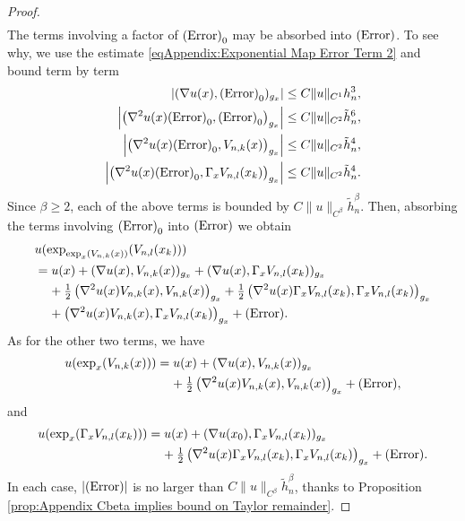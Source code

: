 \documentclass[11pt,reqno]{amsart}
\numberwithin{equation}{section}
\theoremstyle{plain}
\begin{document}
\begin{proof}
\begin{align*}
  \end{align*} 
  The terms involving a factor of $\textnormal{(Error)}_0$ may be absorbed into $\textnormal{(Error)}$. To see why, we use the estimate \eqref{eqAppendix:Exponential Map Error Term 2} and bound term by term
  \begin{align*}  
    |(\nabla u(x),\textnormal{(Error)}_0)_{g_x}| & \leq C\|u\|_{C^1}h_n^3,\\
    \left | \left (\nabla^2u(x)\textnormal{(Error)}_0,\textnormal{(Error)}_0\right )_{g_x}\right | & \leq C\|u\|_{C^2}\tilde h_n^{6},\\
    \left | \left (\nabla^2u(x)\textnormal{(Error)}_0,V_{n,k}(x)\right )_{g_x}\right | & \leq C\|u\|_{C^2}\tilde h_n^4,\\
    \left | \left (\nabla^2u(x)\textnormal{(Error)}_0,\Gamma_xV_{n,l}(x_k)\right )_{g_x}\right | & \leq C\|u\|_{C^2}\tilde h_n^4.	
  \end{align*}
  Since $\beta \geq 2$, each of the above terms is bounded by $C\|u\|_{C^\beta}\tilde h_n^\beta$. Then, absorbing the terms involving $\textnormal{(Error)}_0$ into $\textnormal{(Error)}$ we obtain 
 \begin{align*}
    & u(\exp_{\exp_x(V_{n,k}(x))}(V_{n,l}(x_k)))\\
    & = u(x)+ (\nabla u(x),V_{n,k}(x))_{g_x}+(\nabla u(x),\Gamma_xV_{n,l}(x_k))_{g_x}\\
    & \;\;\;\; + \tfrac{1}{2} \left (\nabla^2u(x) V_{n,k}(x),V_{n,k}(x)\right )_{g_x}+\tfrac{1}{2} \left (\nabla^2u(x)\Gamma_xV_{n,l}(x_k),\Gamma_xV_{n,l}(x_k)\right )_{g_x}\\
    & \;\;\;\; + \left (\nabla^2u(x) V_{n,k}(x),\Gamma_xV_{n,l}(x_k)\right )_{g_x}+ \textnormal{(Error)}.	
 \end{align*}
  As for the other two terms, we have
  \begin{align*}  	
    u(\exp_x(V_{n,k}(x))) & = u(x)+(\nabla u(x),V_{n,k}(x))_{g_x}\\
	& \;\;\;\;+\tfrac{1}{2} \left( \nabla^2u(x)V_{n,k}(x),V_{n,k}(x) \right )_{g_x}+\textnormal{(Error)},
  \end{align*}
  and
  \begin{align*}	
    u(\exp_{x}(\Gamma_{x}V_{n,l}(x_k))) & = u(x)+(\nabla u(x_0),\Gamma_x V_{n,l}(x_k))_{g_x}\\
	& \;\;\;\;+\tfrac{1}{2} \left( \nabla^2u(x)\Gamma_x V_{n,l}(x_k),\Gamma_x V_{n,l}(x_k) \right )_{g_x}+\textnormal{(Error)}.
  \end{align*}
  In each case, $|\textnormal{(Error)}|$ is no larger than $C\|u\|_{C^\beta}\tilde h_n^\beta$, thanks to Proposition \ref{prop:Appendix Cbeta implies bound on Taylor remainder}. 
  

\end{proof}
\end{document}
